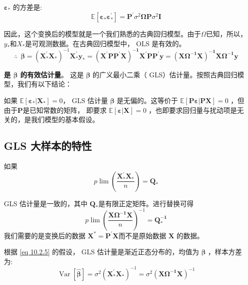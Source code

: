 $ \boldsymbol{\varepsilon_{*}} $ 的方差是:
$$ \mathbb{E}\left[\boldsymbol{\varepsilon_{*} \varepsilon_{*}^{\prime}}\right] 
        = \boldsymbol{P^{\prime}} \sigma^{2} \boldsymbol{\Omega P}\sigma^{2} \boldsymbol{I} $$

因此，这个变换后的模型就是一个我们熟悉的古典回归模型。由于$ \Omega $已知，所以， $ y_{*} $和$ X_{*} $是可观测数据。在古典回归模型中， OLS 是有效的。
\begin{equation}
   \therefore \ \  \boldsymbol{\beta}=\left( \boldsymbol{X_{*}^{\prime} X_{*}}\right)^{-1} 
   \boldsymbol{X_{*}^{\prime} y_{*}=\left(X^{\prime} P P^{\prime} X\right)^{-1} X^{\prime} 
    P P^{\prime} y=\left(X \Omega^{-1} X\right)^{-1} X \Omega^{-1} y}
    \label{eq 10.2.3}
\end{equation}

{\bf 是 $ \boldsymbol{\beta} $ 的有效估计量}。 这是 $ \boldsymbol{\beta} $ 的广义最小二乘（ GLS）估计量。按照古典回归模型，我们有以下结论：

如果 $ \mathbb{E}[ \boldsymbol{\varepsilon_{*}| X_{*}} ] = 0 $， 
GLS 估计量 $ \boldsymbol{\beta} $ 是无偏的。这等价于 $ \mathbb{E}[ \boldsymbol{P \varepsilon | PX} ] = 0$ ，但由于$ \boldsymbol{P} $是已知常数的矩阵，
即要求 $ \mathbb{E}[\boldsymbol{\varepsilon | X }] = 0$ ，也即要求回归量与扰动项是无关的，是我们模型的基本假设。

\subsection{GLS 大样本的特性}

如果
\begin{equation}
    p \lim \left(\frac{ \boldsymbol{X_{*}^{\prime} X_{*}} }{n}\right) = \boldsymbol{Q_{*}}
\end{equation}

GLS 估计量是一致的，其中 $ \boldsymbol{Q_{*}} $是有限正定矩阵。进行替换可得
\begin{equation}
    p \lim \left(\frac{ \boldsymbol{X \Omega^{-1} X} }{n}\right)^{-1} = \boldsymbol{Q_{*}^{-1}}
    \label{eq 10.2.5}
\end{equation}
我们需要的是变换后的数据 $ \boldsymbol{X^{*}=P^{\prime} X} $而不是原始数据 $ \boldsymbol{X} $ 的数据。

根据 \eqref{eq 10.2.5} 的假设， GLS 估计量是渐近正态分布的，均值为 $ \boldsymbol{\beta} $ ，样本方差为:
\begin{equation}
    \operatorname{Var}[\boldsymbol{\hat{\beta}}]
            = \sigma^{2}\left(\boldsymbol{X_{*}^{\prime} X_{*}}\right)^{-1}=\sigma^{2}\left(\boldsymbol{X \Omega^{-1} X}\right)^{-1}
\end{equation}

